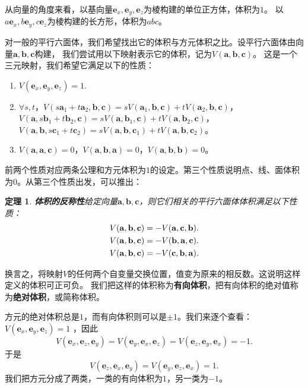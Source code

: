 \documentclass[12pt,UTF8]{ctexbook}
\newtheorem{tm}{定理}[section]
\begin{document}
从向量的角度来看，以基向量$\mathbf{e}_x, \mathbf{e}_y, \mathbf{e}_z$为棱构建的单位正方体，体积为$1$。
以$a\mathbf{e}_x, b\mathbf{e}_y, c\mathbf{e}_z$为棱构建的长方形，体积为$abc$。

对一般的平行六面体，我们希望找出它的体积与方元体积之比。设平行六面体由向量$\mathbf{a},\mathbf{b},\mathbf{c}$构建，
我们尝试用以下映射表示它的体积，记为$V(\mathbf{a},\mathbf{b},\mathbf{c})$。
这是一个三元映射，我们希望它满足以下的性质：
\begin{enumerate}
    \item $V(\mathbf{e}_x, \mathbf{e}_y, \mathbf{e}_z) = 1.$ 
    \item $\forall s,t$，$V(s\mathbf{a}_1+t\mathbf{a}_2,\mathbf{b},\mathbf{c}) = sV(\mathbf{a}_1,\mathbf{b},\mathbf{c})+tV(\mathbf{a}_2,\mathbf{b},\mathbf{c})$，$V(\mathbf{a},s\mathbf{b}_1+t\mathbf{b}_2,\mathbf{c}) = sV(\mathbf{a},\mathbf{b}_1,\mathbf{c})+tV(\mathbf{a},\mathbf{b}_2,\mathbf{c})$，$V(\mathbf{a},\mathbf{b},s\mathbf{c}_1+t\mathbf{c}_2) = sV(\mathbf{a},\mathbf{b},\mathbf{c}_1)+tV(\mathbf{a},\mathbf{b},\mathbf{c}_2)$。
    \item $V(\mathbf{a},\mathbf{a},\mathbf{c}) = 0$，$V(\mathbf{a},\mathbf{b},\mathbf{a})=0$，$V(\mathbf{a},\mathbf{b},\mathbf{b})=0$。
\end{enumerate}
前两个性质对应两条公理和方元体积为$1$的设定。第三个性质说明点、线、面体积为$0$。从第三个性质出发，可以推出：
\begin{tm}{\textbf{体积的反称性}}\label{tm:3-0-0}
    给定向量$\mathbf{a},\mathbf{b},\mathbf{c}$，则它们相关的平行六面体体积满足以下性质：
    \begin{align}
        V(\mathbf{a},\mathbf{b},\mathbf{c}) &= -V(\mathbf{a},\mathbf{c},\mathbf{b}). \notag \\
        V(\mathbf{a},\mathbf{b},\mathbf{c}) &= -V(\mathbf{b},\mathbf{a},\mathbf{c}). \notag \\
        V(\mathbf{a},\mathbf{b},\mathbf{c}) &= -V(\mathbf{c},\mathbf{b},\mathbf{a}). \notag 
    \end{align}
\end{tm}
换言之，将映射$V$的任何两个自变量交换位置，值变为原来的相反数。这说明这样定义的体积可正可负。
我们把这样的体积称为\textbf{有向体积}，把有向体积的绝对值称为\textbf{绝对体积}，或简称体积。

方元的绝对体积总是$1$，而有向体积则可以是$\pm 1$。我们来逐个查看：
$V(\mathbf{e}_x, \mathbf{e}_y, \mathbf{e}_z) = 1$ ，因此
$$ V(\mathbf{e}_x, \mathbf{e}_z, \mathbf{e}_y) = V(\mathbf{e}_y, \mathbf{e}_x, \mathbf{e}_z)  = V(\mathbf{e}_z, \mathbf{e}_y, \mathbf{e}_x)  = -1.$$
于是
$$ V(\mathbf{e}_z, \mathbf{e}_x, \mathbf{e}_y) = V(\mathbf{e}_y, \mathbf{e}_z, \mathbf{e}_x)   = 1.$$
我们把方元分成了两类，一类的有向体积为$1$，另一类为$-1$。
\end{document}

